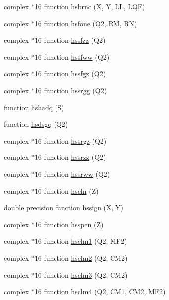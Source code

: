 \begin{DoxyCompactItemize}
\item 
complex $\ast$16 function \hyperlink{djangoh__h_8f_aad43c59ee9357789a332bbb961d55a34}{hsbrnc} (X, Y, L\+L, L\+Q\+F)
\item 
complex $\ast$16 function \hyperlink{djangoh__h_8f_aa5192bede58469d1b57ed2aa1ee4b27b}{hsfone} (Q2, R\+M, R\+N)
\item 
complex $\ast$16 function \hyperlink{djangoh__h_8f_a58a60617eda31856420c23f87d10fbeb}{hssfzz} (Q2)
\item 
complex $\ast$16 function \hyperlink{djangoh__h_8f_a7c6d4a59bfe41cfcb95989acaddf651c}{hssfww} (Q2)
\item 
complex $\ast$16 function \hyperlink{djangoh__h_8f_a079f3d821e8ec479336f1a89dc20a8e0}{hssfgz} (Q2)
\item 
complex $\ast$16 function \hyperlink{djangoh__h_8f_a8fbe59003676acd8b388d3965e585a66}{hssrgg} (Q2)
\item 
function \hyperlink{djangoh__h_8f_a3f00399e4ac825fb1b7dbeb982380960}{hshadq} (S)
\item 
function \hyperlink{djangoh__h_8f_a9cd17c523f49f61903b0d778ec11a2f3}{hsdsgq} (Q2)
\item 
complex $\ast$16 function \hyperlink{djangoh__h_8f_ab8dc6ec1b48539fafef87e1abf84d1ac}{hssrgz} (Q2)
\item 
complex $\ast$16 function \hyperlink{djangoh__h_8f_a55e3921f77e29078352fea7906002fba}{hssrzz} (Q2)
\item 
complex $\ast$16 function \hyperlink{djangoh__h_8f_a75f51f829e7f7cf9133330bad9a42ac5}{hssrww} (Q2)
\item 
complex $\ast$16 function \hyperlink{djangoh__h_8f_a592dda9797bd5057f53f7e3955c16ab9}{hscln} (Z)
\item 
double precision function \hyperlink{djangoh__h_8f_aa20f442acbbf3733b98be0aa1050a531}{hssign} (X, Y)
\item 
complex $\ast$16 function \hyperlink{djangoh__h_8f_ae7f485154ac96066356885f2e73926ad}{hsspen} (Z)
\item 
complex $\ast$16 function \hyperlink{djangoh__h_8f_aa73a3da66e3805e1c582500aa571bb24}{hsclm1} (Q2, M\+F2)
\item 
complex $\ast$16 function \hyperlink{djangoh__h_8f_a9191e08bf7b1e7691309c6944bc34528}{hsclm2} (Q2, C\+M2)
\item 
complex $\ast$16 function \hyperlink{djangoh__h_8f_a720a93e4f8ea99c1f2266cbbefc41cce}{hsclm3} (Q2, C\+M2)
\item 
complex $\ast$16 function \hyperlink{djangoh__h_8f_adda066980e90daedd90329553f306765}{hsclm4} (Q2, C\+M1, C\+M2, M\+F2)

\end{DoxyCompactItemize}
